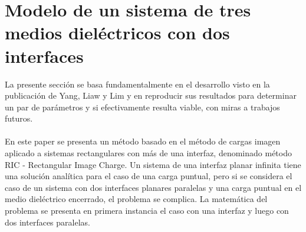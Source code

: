 \documentclass[12pt, notitlepage]{article}
\begin{document}
\section{Modelo de un sistema de tres medios dieléctricos con dos interfaces}
La presente sección se basa fundamentalmente en el desarrollo visto en la publicación de Yang, Liaw y Lim \cite{Pei-kun} y en reproducir sus resultados para determinar un par de parámetros y si efectivamente resulta viable, con miras a trabajos futuros.\\\\
En este paper se presenta un método basado en el método de cargas imagen aplicado a sistemas rectangulares con más de una interfaz, denominado método RIC - Rectangular Image Charge. Un sistema de una interfaz planar infinita tiene una solución analítica para el caso de una carga puntual, pero si se considera el caso de un sistema con dos interfaces planares paralelas y una carga puntual en el medio dieléctrico encerrado, el problema se complica. La matemática del problema se presenta en primera instancia el caso con una interfaz y luego con dos interfaces paralelas.
\end{document}
